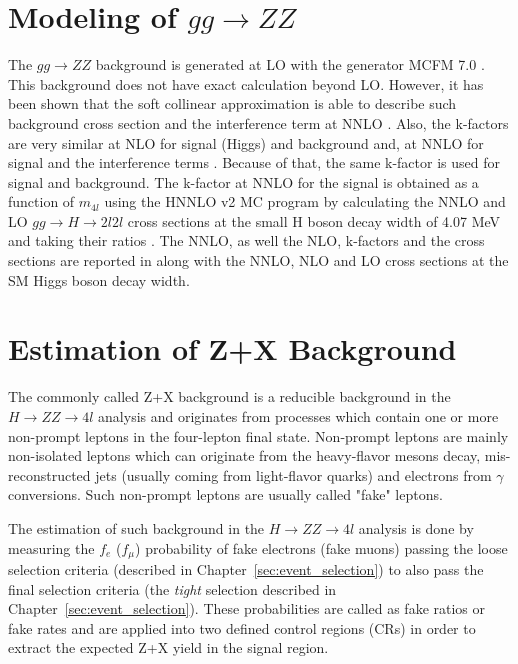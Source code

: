 \section{Modeling of $gg \rightarrow ZZ$}
\label{sec:ggzz_modeling}
The $gg \rightarrow ZZ$ background is generated at LO with the generator MCFM 7.0 \cite{bib:NPPS-10-205}. This background does not have exact calculation beyond LO. However, it has been shown that the soft collinear approximation is able to describe such background cross section and the interference term at NNLO \cite{bib:PhysRevD-88-2013-034032}. Also, the k-factors are very similar at NLO for signal (Higgs) and background \cite{bib:PhysLettB-774-2015-43} and, at NNLO for signal and the interference terms \cite{bib:JHEP-1508-2015-065}. Because of that, the same k-factor is used for signal and background. The k-factor at NNLO for the signal is obtained as a function of $m_{4l}$ using the HNNLO v2 MC program by calculating the NNLO and LO $gg \rightarrow H \rightarrow 2l2l$ cross sections at the small H boson decay width of 4.07 MeV and taking their ratios \cite{bib:PhysRevLett-98-2007-222002, bib:JHEP-02-2008-043, bib:JHEP-09-2013-129}. The NNLO, as well the NLO, k-factors and the cross sections are reported in \cite{bib:CMS-AN-16-442} along with the NNLO, NLO and LO cross sections at the SM Higgs boson decay width.

\section{Estimation of Z+X Background}
\label{sec:zx_estimation}
The commonly called Z+X background is a reducible background in the $H \rightarrow ZZ \rightarrow 4l$ analysis and originates from processes which contain one or more non-prompt leptons in the four-lepton final state. Non-prompt leptons are mainly non-isolated leptons which can originate from the heavy-flavor mesons decay, mis-reconstructed jets (usually coming from light-flavor quarks) and electrons from $\gamma$ conversions. Such non-prompt leptons are usually called "fake" leptons.

The estimation of such background in the $H \rightarrow ZZ \rightarrow 4l$ analysis is done by measuring the $f_{e}$ ($f_{\mu}$) probability of fake electrons (fake muons) passing the loose selection criteria (described in Chapter~\ref{sec:event_selection}) to also pass the final selection criteria (the \textit{tight} selection described in Chapter~\ref{sec:event_selection}). These probabilities are called as fake ratios or fake rates and are applied into two defined control regions (CRs) in order to extract the expected Z+X yield in the signal region.

